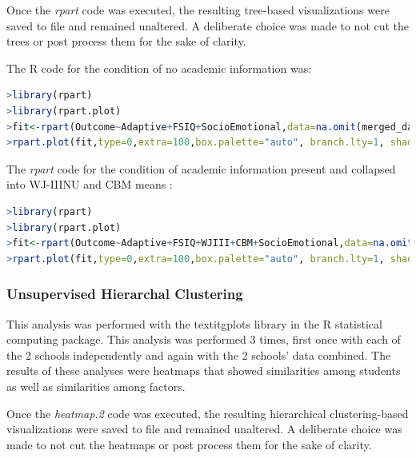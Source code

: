 \documentclass[twoside]{article}
\begin{document}
Once the \textit{rpart} code was executed, the resulting tree-based visualizations were saved to file and remained unaltered. A deliberate choice was made to not cut the trees or post process them for the sake of clarity. 

The R code for the condition of no academic information was:
\begin{lstlisting}[language=R]
>library(rpart)
>library(rpart.plot)
>fit<-rpart(Outcome~Adaptive+FSIQ+SocioEmotional,data=na.omit(merged_data), method="class",parms=list(prior=c(.3,.3,.4)),cost=c(3,1,1), control=rpart.control(minsplit=1,minbucket=1,cp=-1))
>rpart.plot(fit,type=0,extra=100,box.palette="auto", branch.lty=1, shadow.col="gray", nn=TRUE, under=TRUE,tweak=.75,main="Decision Tree (Academic Testing Absent)")
\end{lstlisting}

The \textit{rpart} code for the condition of academic information present and collapsed into WJ-IIINU and CBM means :
\begin{lstlisting}[language=R]
>library(rpart)
>library(rpart.plot)
>fit<-rpart(Outcome~Adaptive+FSIQ+WJIII+CBM+SocioEmotional,data=na.omit(OHdata), method="class",parms=list(prior=c(.3,.3,.4)),cost=c(3,1,2,2,1),control=rpart.control(minsplit=1, minbucket=1,cp=-1, mincriterion=.5))
>rpart.plot(fit,type=0,extra=100,box.palette="auto", branch.lty=1, shadow.col="gray", nn=TRUE, under=TRUE,tweak=.75,main="Decision Tree (Academic Testing Present)")
\end{lstlisting}

\subsubsection{Unsupervised Hierarchal Clustering}

This analysis was performed with the textit{gplots} library in the R statistical computing package. This analysis was performed 3 times, first once with each of the 2 schools independently and again with the 2 schools' data combined. The results of these analyses were heatmaps that showed similarities among students as well as similarities among factors.

Once the \textit{heatmap.2} code was executed, the resulting hierarchical clustering-based visualizations were saved to file and remained unaltered. A deliberate choice was made to not cut the heatmaps or post process them for the sake of clarity. 
\end{document}
